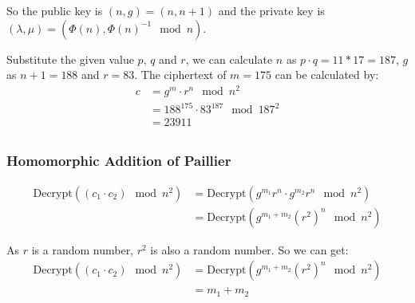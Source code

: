 \documentclass[a4paper,12pt]{article}
\begin{document}
So the public key is $(n, g) = (n, n + 1)$ and the private key is $(\lambda, \mu) = (\Phi(n), \Phi(n)^{-1} \mod n)$.

Substitute the given value $p$, $q$ and $r$, we can calculate $n$ as $p\cdot q = 11 * 17  = 187$, $g$ as $n + 1 = 188$ and $r = 83$. The ciphertext of $m = 175$ can be calculated by:
\begin{equation}
    \begin{aligned}
        c & = g^m \cdot r^n \mod n^2              \\
          & = 188^{175} \cdot 83^{187} \mod 187^2 \\
          & = 23911                               \\
    \end{aligned}
\end{equation}

\subsubsection{Homomorphic Addition of Paillier}
\begin{equation}
    \begin{aligned}
        \mathrm{Decrypt}((c_1 \cdot c_2) \mod n^2) & = \mathrm{Decrypt}(g^{m_1}r^{n}\cdot g^{m_2}r^{n} \mod n^2) \\
                                                   & = \mathrm{Decrypt}(g^{m_1 + m_2}(r^2)^n \mod n^2)
    \end{aligned}
\end{equation}

As $r$ is a random number, $r^2$ is also a random number. So we can get:
\begin{equation}
    \begin{aligned}
        \mathrm{Decrypt}((c_1 \cdot c_2) \mod n^2) & = \mathrm{Decrypt}(g^{m_1 + m_2}(r^2)^n \mod n^2) \\
                                                   & = m_1 + m_2                                       \\
    \end{aligned}
\end{equation}
\end{document}
